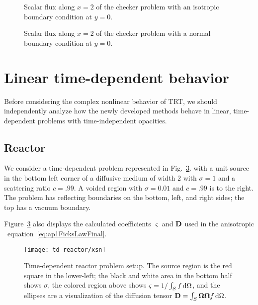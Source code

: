 \begin{figure}[htb]
  \centering\small
  \hspace{-.5in}
  
  \hspace{-.5in}
  \caption{Scalar flux along $x=2$ of the checker problem with an isotropic
  boundary condition at $y=0$.}
  \label{fig:bcCheckersIsotropic}
\end{figure}

\begin{figure}[htb]
  \centering\small
  \hspace{-.5in}
  
  \hspace{-.5in}
  \caption{Scalar flux along $x=2$ of the checker problem with a normal
  boundary condition at $y=0$.}
  \label{fig:bcCheckersDelta}
\end{figure}

\clearpage
\section{Linear time-dependent behavior}

Before considering the complex nonlinear behavior of TRT, we should
independently analyze how the newly developed methods behave in linear,
time-dependent problems with time-independent opacities.

\subsection{Reactor}

We consider a time-dependent problem represented in
Fig.~\ref{fig:tdReactorProblem}.
with a unit source in the bottom left corner of a diffusive medium of width
$2$ with $\sigma=1$ and a scattering ratio $c=.99$. A voided region with
$\sigma=0.01$ and $c=.99$ is to the right. The problem has reflecting boundaries
on the bottom, left, and right sides; the top has a vacuum boundary.

Figure~\ref{fig:tdReactorProblem} also displays the calculated coefficients
$\varsigma$ and $\mathbf{D}$ used in the anisotropic \Pone\
equation~\eqref{eq:ap1FicksLawFinal}.

\begin{figure}[bp]
  \centering
  \texttt{[image: td\_reactor/xsn]}
  \caption[Time-dependent reactor problem setup.]{Time-dependent reactor problem
    setup. The source region is the red square in the lower-left; the black
    and white area in the bottom half shows $\sigma$, the colored region above
    shows $\varsigma = 1/\int_{S} f \mathop{}\!\mathrm{d}\Omega$, and the ellipses are a
    visualization of the diffusion tensor $\mathbf{D}=\int_{S}
    \bm{\Omega}\bm{\Omega} f \mathop{}\!\mathrm{d}\Omega$.}
  \label{fig:tdReactorProblem}
\end{figure}

